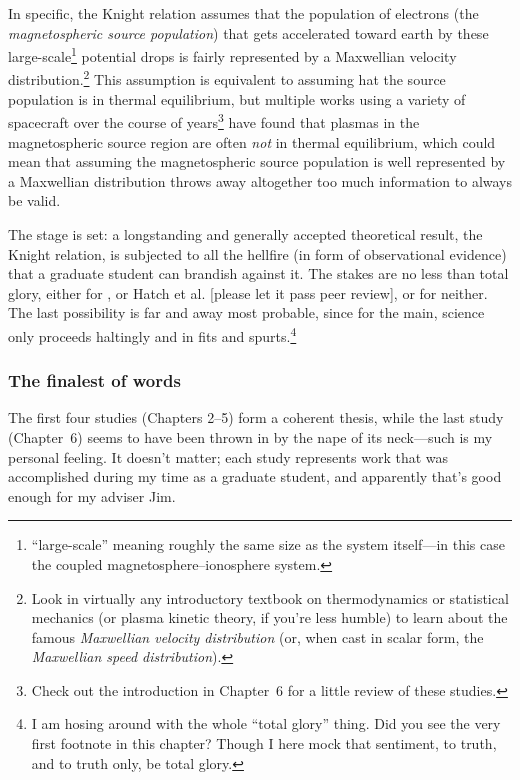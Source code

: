 In specific, the Knight relation assumes that the population of electrons (the
\emph{magnetospheric source population}) that gets accelerated toward earth by
these large-scale\footnote{``large-scale'' meaning roughly the same size as the
  system itself---in this case the coupled magnetosphere--ionosphere system.}
potential drops is fairly represented by a Maxwellian velocity
distribution.\footnote{Look in virtually any introductory textbook on
  thermodynamics or statistical mechanics (or plasma kinetic theory, if you're
  less humble) to learn about the famous \emph{Maxwellian velocity distribution}
  (or, when cast in scalar form, the \emph{Maxwellian speed distribution}).}
This assumption is equivalent to assuming hat the source population is in
thermal equilibrium, but multiple works using a variety of spacecraft over the
course of years\footnote{Check out the introduction in Chapter~6 for a little
  review of these studies.} have found that plasmas in the magnetospheric source
region are often \emph{not} in thermal equilibrium, which could mean that
assuming the magnetospheric source population is well represented by a
Maxwellian distribution throws away altogether too much information to always be
valid.

The stage is set: a longstanding and generally accepted theoretical result, the
Knight relation, is subjected to all the hellfire (in form of observational
evidence) that a graduate student can brandish against it. The stakes are no
less than total glory, either for \citet{Knight1973}, or Hatch et al. [please
let it pass peer review], or for neither. The last possibility is far and away
most probable, since for the main, science only proceeds haltingly and in fits
and spurts.\footnote{I am hosing around with the whole ``total glory''
  thing. Did you see the very first footnote in this chapter? Though I here mock
  that sentiment, to truth, and to truth only, be total glory.}

\subsubsection{The finalest of words}

The first four studies (Chapters 2--5) form a coherent thesis, while the last
study (Chapter~6) seems to have been thrown in by the nape of its neck---such is
my personal feeling. It doesn't matter; each study represents work that was
accomplished during my time as a graduate student, and apparently that's good
enough for my adviser Jim. 

